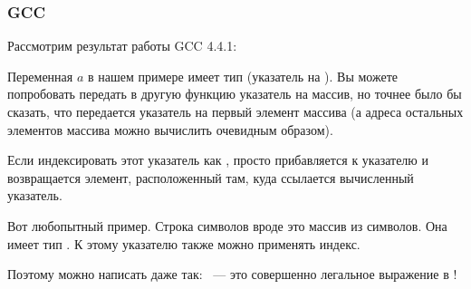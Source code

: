\subsubsection{GCC}

Рассмотрим результат работы GCC 4.4.1:



Переменная $a$ в нашем примере имеет тип  (указатель на \Tint{}).
Вы можете попробовать передать в другую функцию указатель на массив,
но точнее было бы сказать, что передается указатель на первый элемент массива
(а адреса остальных элементов массива можно вычислить очевидным образом).

Если индексировать этот указатель как ,  просто прибавляется к указателю 
и возвращается элемент, расположенный там, куда ссылается вычисленный указатель.

Вот любопытный пример. Строка символов вроде  это массив из символов. 
Она имеет тип .
К этому указателю также можно применять индекс.

Поэтому можно написать даже так:  ~--- это совершенно легальное выражение в \CCpp!

